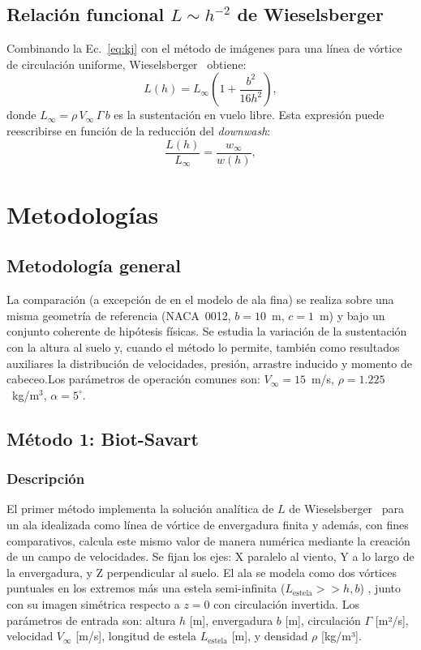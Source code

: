 \documentclass[twocolumn]{article}
\begin{document}
\subsection{Relación funcional $L \sim h^{-2}$ de Wieselsberger}

Combinando la Ec.~\eqref{eq:kj} con el método de imágenes para una línea de
vórtice de circulación uniforme, Wieselsberger~\cite{wieselsberger1922} obtiene:
\begin{equation}
  L(h) = L_\infty \left(1 + \frac{b^2}{16h^2}\right),
  \label{eq:wieselsberger}
\end{equation}
donde $L_\infty = \rho\,V_\infty\,\Gamma\,b$ es la sustentación en vuelo libre.
Esta expresión puede reescribirse en función de la reducción del
\textit{downwash}:
\begin{equation}
  \frac{L(h)}{L_\infty} = \frac{w_\infty}{w(h)},
  \label{eq:prop_w}
\end{equation}

\section{Metodologías}

\subsection{Metodología general}
La comparación (a excepción de en el modelo de ala fina) se realiza sobre una misma geometría de referencia (NACA~0012, $b = 10$~m, $c = 1$~m) y bajo un conjunto coherente de hipótesis físicas. Se estudia la variación de la sustentación con la altura al suelo y, cuando el método lo permite, también como resultados auxiliares la distribución de velocidades, presión, arrastre inducido y momento de cabeceo.Los parámetros de operación comunes son: $V_\infty = 15$~m/s,
$\rho = 1.225$~kg/m$^3$, $\alpha = 5^\circ$.

\subsection{Método 1: Biot-Savart}

\subsubsection{Descripción}

El primer método implementa la solución analítica de $L$ de Wieselsberger~\cite{wieselsberger1922} para un ala idealizada como línea de vórtice de envergadura finita y además, con fines comparativos, calcula este mismo valor de manera numérica mediante la creación de un campo de velocidades. Se fijan los ejes: X paralelo al viento, Y a lo largo de la envergadura, y Z perpendicular al suelo. El ala se modela como dos vórtices puntuales en los extremos más una estela semi-infinita ($L_{\text{estela}}>>h,b$) , junto con su imagen simétrica respecto a $z = 0$ con circulación invertida. Los parámetros de entrada son: altura $h$ [m], envergadura $b$ [m], circulación $\Gamma$ [m²/s], velocidad $V_\infty$ [m/s], longitud de estela $L_{\text{estela}}$ [m], y densidad $\rho$ [kg/m³].
\end{document}
